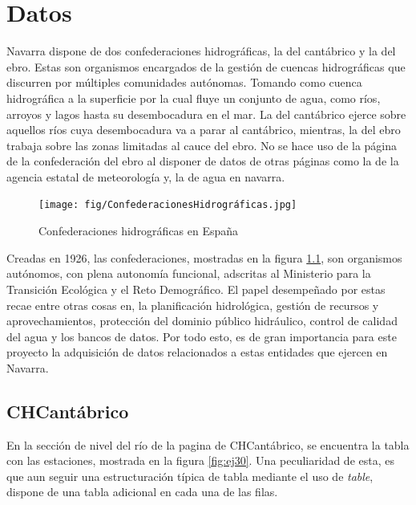 \chapter[Datos]{Datos}
\label{Chap2}

Navarra dispone de dos confederaciones hidrográficas, la del cantábrico y la del ebro. Estas son organismos encargados de la gestión de cuencas hidrográficas que discurren por múltiples comunidades autónomas. Tomando como cuenca hidrográfica a la superficie por la cual fluye un conjunto de agua, como ríos, arroyos y lagos hasta su desembocadura en el mar.\newline
\newline
La del cantábrico ejerce sobre aquellos ríos cuya desembocadura va a parar al cantábrico, mientras, la del ebro trabaja sobre las zonas limitadas al cauce del ebro.\newline
\newline
No se hace uso de la página de la confederación del ebro al disponer de datos de otras páginas como la de la agencia estatal de meteorología y, la de agua en navarra. 

\begin{figure} [H]
	\centering
	\texttt{[image: fig/ConfederacionesHidrográficas.jpg]}
	\caption[Confederaciones hidrográficas en España]{Confederaciones hidrográficas en España}
	\label{fig:ej32}
\end{figure}

Creadas en 1926, las confederaciones, mostradas en la figura \ref{fig:ej32}, son organismos autónomos, con plena autonomía funcional, adscritas al Ministerio para la Transición Ecológica y el Reto Demográfico. El papel desempeñado por estas recae entre otras cosas en, la planificación hidrológica, gestión de recursos y aprovechamientos, protección del dominio público hidráulico, control de calidad del agua y los bancos de datos.\newline
\newline
Por todo esto, es de gran importancia para este proyecto la adquisición de datos relacionados a estas entidades que ejercen en Navarra.

\section{CHCantábrico}
En la sección de nivel del río de la pagina de CHCantábrico, se encuentra la tabla con las estaciones, mostrada en la figura \ref{fig:ej30}. Una peculiaridad de esta, es que aun seguir una estructuración típica de tabla mediante el uso de \textit{table}, dispone de una tabla adicional en cada una de las filas.

